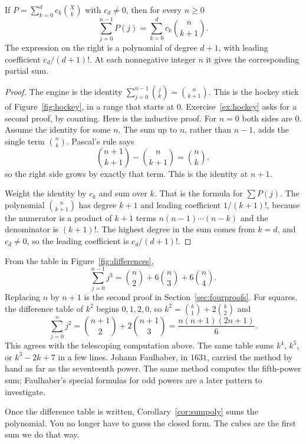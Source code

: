 \begin{corollary}\label{cor:sumpoly}
If $P=\sum_{k=0}^dc_k\binom Xk$ with $c_d\ne0$, then for every $n\ge0$
\[
\sum_{j=0}^{n-1}P(j)=\sum_{k=0}^dc_k\binom n{k+1}.
\]
The expression on the right is a polynomial of degree $d+1$, with leading coefficient $c_d/(d+1)!$. At each nonnegative integer $n$ it gives the corresponding partial sum.
\end{corollary}
\begin{proof}
The engine is the identity $\sum_{j=0}^{n-1}\binom jk=\binom n{k+1}$. This is the hockey stick of Figure~\ref{fig:hockey}, in a range that starts at $0$. Exercise~\ref{ex:hockey} asks for a second proof, by counting. Here is the inductive proof. For $n=0$ both sides are $0$. Assume the identity for some $n$. The sum up to $n$, rather than $n-1$, adds the single term $\binom nk$. Pascal's rule says
\[
\binom{n+1}{k+1}-\binom n{k+1}=\binom nk,
\]
so the right side grows by exactly that term. This is the identity at $n+1$.

Weight the identity by $c_k$ and sum over $k$. That is the formula for $\sum P(j)$. The polynomial $\binom n{k+1}$ has degree $k+1$ and leading coefficient $1/(k+1)!$, because the numerator is a product of $k+1$ terms $n(n-1)\cdots(n-k)$ and the denominator is $(k+1)!$. The highest degree in the sum comes from $k=d$, and $c_d\ne0$, so the leading coefficient is $c_d/(d+1)!$.
\end{proof}

\begin{examplex}
From the table in Figure~\ref{fig:differences},
\[
\sum_{j=0}^{n-1}j^3=\binom n2+6\binom n3+6\binom n4.
\]
Replacing $n$ by $n+1$ is the second proof in Section~\ref{sec:fourproofs}. For squares, the difference table of $k^2$ begins $0,1,2,0$, so $k^2=\binom k1+2\binom k2$ and
\[
\sum_{j=0}^{n}j^2=\binom{n+1}{2}+2\binom{n+1}{3}=\frac{n(n+1)(2n+1)}{6}.
\]
This agrees with the telescoping computation above. The same table sums $k^4$, $k^5$, or $k^3-2k+7$ in a few lines. Johann Faulhaber, in $1631$, carried the method by hand as far as the seventeenth power. The same method computes the fifth-power sum; Faulhaber's special formulas for odd powers are a later pattern to investigate.
\end{examplex}

Once the difference table is written, Corollary~\ref{cor:sumpoly} sums the polynomial. You no longer have to guess the closed form. The cubes are the first sum we do that way.

